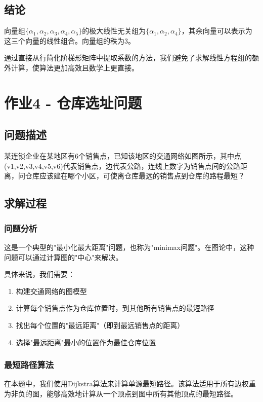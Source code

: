 \documentclass[bwprint]{cumcmthesis}
\begin{document}
\subsection{结论}
向量组$\{\alpha_1, \alpha_2, \alpha_3, \alpha_4, \alpha_5\}$的极大线性无关组为$\{\alpha_1, \alpha_2, \alpha_4\}$，其余向量可以表示为这三个向量的线性组合。向量组的秩为3。

通过直接从行简化阶梯形矩阵中提取系数的方法，我们避免了求解线性方程组的额外计算，使算法更加高效且数学上更直接。

\section{作业4 - 仓库选址问题}

\subsection{问题描述}
某连锁企业在某地区有6个销售点，已知该地区的交通网络如图所示，其中点(v1,v2,v3,v4,v5,v6)代表销售点，边代表公路，连线上数字为销售点间的公路距离，问仓库应该建在哪个小区，可使离仓库最远的销售点到仓库的路程最短？

\subsection{求解过程}

\subsubsection{问题分析}
这是一个典型的"最小化最大距离"问题，也称为"minimax问题"。在图论中，这种问题可以通过计算图的"中心"来解决。

具体来说，我们需要：
\begin{enumerate}
    \item 构建交通网络的图模型
    \item 计算每个销售点作为仓库位置时，到其他所有销售点的最短路径
    \item 找出每个位置的"最远距离"（即到最远销售点的距离）
    \item 选择"最远距离"最小的位置作为最佳仓库位置
\end{enumerate}

\subsubsection{最短路径算法}
在本题中，我们使用Dijkstra算法来计算单源最短路径。该算法适用于所有边权重为非负的图，能够高效地计算从一个顶点到图中所有其他顶点的最短路径。
\end{document}
